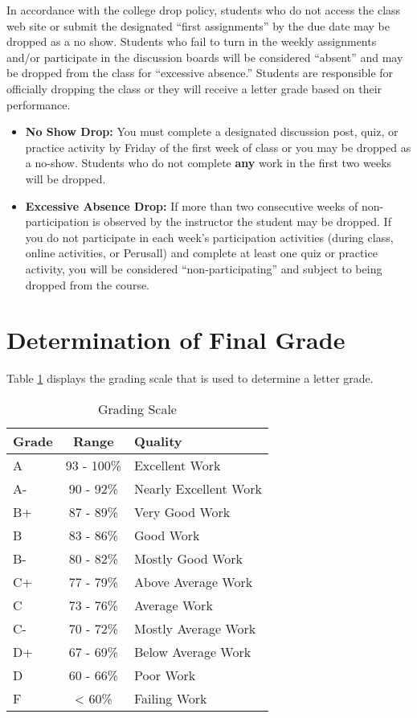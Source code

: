 \documentclass[11pt,]{article}
\begin{document}
In accordance with the college drop policy, students who do not access
the class web site or submit the designated ``first assignments'' by the
due date may be dropped as a no show. Students who fail to turn in the
weekly assignments and/or participate in the discussion boards will be
considered ``absent'' and may be dropped from the class for ``excessive
absence.'' Students are responsible for officially dropping the class or
they will receive a letter grade based on their performance.

\begin{itemize}
\item
  \textbf{No Show Drop:} You must complete a designated discussion post,
  quiz, or practice activity by Friday of the first week of class or you
  may be dropped as a no-show. Students who do not complete \textbf{any}
  work in the first two weeks will be dropped.
\item
  \textbf{Excessive Absence Drop:} If more than two consecutive weeks of
  non-participation is observed by the instructor the student may be
  dropped. If you do not participate in each week's participation
  activities (during class, online activities, or Perusall) and complete
  at least one quiz or practice activity, you will be considered
  ``non-participating'' and subject to being dropped from the course.
\end{itemize}

\hypertarget{determination-of-final-grade}{%
\section{Determination of Final
Grade}\label{determination-of-final-grade}}

Table \ref{tab:grade_scale} displays the grading scale that is used to
determine a letter grade.

\renewcommand{\arraystretch}{1.5}

\begin{table}[!h]

\caption{\label{tab:grade_scale}Grading Scale}
\centering
\fontsize{10}{12}\selectfont
\begin{tabular}[t]{l|c|l}
\hline
\textbf{Grade} & \textbf{Range} & \textbf{Quality}\\
\hline
A & 93 - 100\% & Excellent Work\\
\hline
A- & 90 - 92\% & Nearly Excellent Work\\
\hline
B+ & 87 - 89\% & Very Good Work\\
\hline
B & 83 - 86\% & Good Work\\
\hline
B- & 80 - 82\% & Mostly Good Work\\
\hline
C+ & 77 - 79\% & Above Average Work\\
\hline
C & 73 - 76\% & Average Work\\
\hline
C- & 70 - 72\% & Mostly Average Work\\
\hline
D+ & 67 - 69\% & Below Average Work\\
\hline
D & 60 - 66\% & Poor Work\\
\hline
F & < 60\% & Failing Work\\
\hline
\end{tabular}
\end{table}
\end{document}
